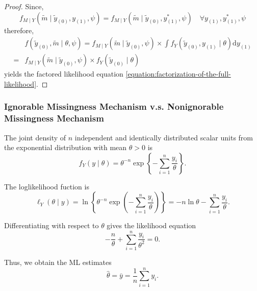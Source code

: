 \begin{proof}
	Since,
	\begin{equation}
		f_{M \mid Y}\left(\tilde{m} \mid \tilde{y}_{(0)}, y_{(1)}, \psi\right)=f_{M \mid Y}\left(\tilde{m} \mid \tilde{y}_{(0)}, y_{(1)}^{*}, \psi\right) \quad \forall y_{(1)}, y_{(1)}^{*}, \psi
	\end{equation}
	therefore,
	\begin{equation}
		\begin{aligned}
			  & f\left(\tilde{y}_{(0)}, \tilde{m} \mid \theta, \psi\right)=f_{M \mid Y}\left(\tilde{m} \mid \tilde{y}_{(0)}, \psi\right) \times \int f_{Y}\left(\tilde{y}_{(0)}, y_{(1)} \mid \theta\right) \mathrm{d} y_{(1)} \\
			= & f_{M \mid Y}\left(\tilde{m} \mid \tilde{y}_{(0)}, \psi\right) \times f_{Y}\left(\tilde{y}_{(0)} \mid \theta\right)
		\end{aligned}
	\end{equation}
	yields the factored likelihood equation \ref{equation:factorization-of-the-full-likelihood}.
\end{proof}

\subsubsection{Ignorable Missingness Mechanism v.s. Nonignorable Missingness Mechanism}

\begin{example}
	The joint density of $n$ independent and identically distributed scalar units from the exponential distribution with mean $\theta>0$ is
	\begin{equation}
		f_{Y}(y\mid\theta)=\theta^{-n}\exp\left\{-\sum_{i=1}^{n}\frac{y_{i}}{\theta}\right\}.
	\end{equation}

	The loglikelihood fuction is
	\begin{equation}
		\ell_{Y}(\theta\mid y)=\ln\left\{\theta^{-n}\exp\left(-\sum_{i=1}^{n}\frac{y_{i}}{\theta}\right)\right\}=-n\ln\theta-\sum_{i=1}^{n}\frac{y_{i}}{\theta}.
	\end{equation}

	Differentiating with respect to $\theta$ gives the likelihood equation
	\begin{equation}
		-\frac{n}{\theta}+\sum_{i=1}^{n} \frac{y_{i}}{\theta^{2}}=0.
	\end{equation}

	Thus, we obtain the ML estimates
	\begin{equation}
		\hat{\theta}=\bar{y}=\frac{1}{n}\sum_{i=1}^{n}y_i.
	\end{equation}
\end{example}

